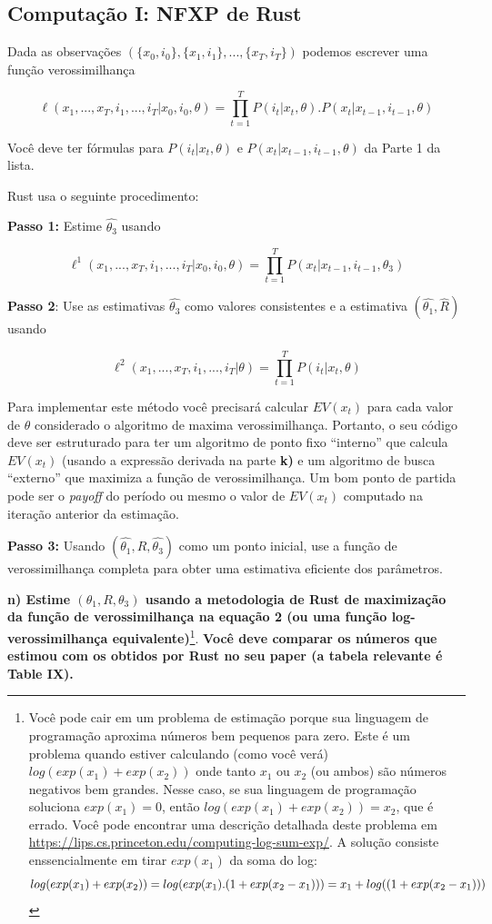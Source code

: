 \documentclass[12pt,a4paper]{article}
\let\rmarkdownfootnote\footnote%
\def\footnote{\protect\rmarkdownfootnote}
\begin{document}
\hypertarget{computacao-i-nfxp-de-rust}{%
\subsection{Computação I: NFXP de
Rust}\label{computacao-i-nfxp-de-rust}}

Dada as observações
\((\{x_0, i_0\},\{x_1,i_1\} , . . . , \{x_T, i_T\})\) podemos escrever
uma função verossimilhança

\[
\ell (x_1,...,x_T,i_1,...,i_T|x_0,i_0,\theta) = \prod_{t=1}^T P(i_t|x_t,\theta).P(x_t|x_{t-1},i_{t-1},\theta)
\label{eq:2}
\]

Você deve ter fórmulas para \(P(i_t|x_t,\theta)\) e
\(P(x_t|x_{t-1},i_{t-1},\theta)\) da Parte 1 da lista.

Rust usa o seguinte procedimento:

\textbf{Passo 1:} Estime \(\hat{\theta_3}\) usando

\[
\ell^1 (x_1,...,x_T,i_1,...,i_T|x_0,i_0,\theta) = \prod_{t=1}^T P(x_t|x_{t-1},i_{t-1},\theta_3)
\]

\textbf{Passo 2}: Use as estimativas \(\hat{\theta_3}\) como valores
consistentes e a estimativa \((\hat{\theta_1},\hat{R})\) usando

\[
\ell^2 (x_1,...,x_T,i_1,...,i_T|\theta)= \prod_{t=1}^T P(i_t|x_t,\theta)
\]

Para implementar este método você precisará calcular \(EV(x_t)\) para
cada valor de \(\theta\) considerado o algoritmo de maxima
verossimilhança. Portanto, o seu código deve ser estruturado para ter um
algoritmo de ponto fixo ``interno'' que calcula \(EV(x_t)\) (usando a
expressão derivada na parte \textbf{k)} e um algoritmo de busca
``externo'' que maximiza a função de verossimilhança. Um bom ponto de
partida pode ser o \emph{payoff} do período ou mesmo o valor de
\(EV(x_t)\) computado na iteração anterior da estimação.

\textbf{Passo 3:} Usando \((\hat{\theta_1},\hat{R},\hat{\theta_3})\)
como um ponto inicial, use a função de verossimilhança completa para
obter uma estimativa eficiente dos parâmetros.

\textbf{n) Estime \((\theta_1, R,\theta_3)\) usando a metodologia de
Rust de maximização da função de verossimilhança na equação 2 (ou uma
função log-verossimilhança equivalente)}\footnote{Você pode cair em um
  problema de estimação porque sua linguagem de programação aproxima
  números bem pequenos para zero. Este é um problema quando estiver
  calculando (como você verá) \(log(exp(x_1) + exp(x_2))\) onde tanto
  \(x_1\) ou \(x_2\) (ou ambos) são números negativos bem grandes. Nesse
  caso, se sua linguagem de programação soluciona \(exp(x_1)= 0\), então
  \(log(exp(x_1) + exp(x_2))=x_2\), que é errado. Você pode encontrar
  uma descrição detalhada deste problema em
  \url{https://lips.cs.princeton.edu/computing-log-sum-exp/}. A solução
  consiste enssencialmente em tirar \(exp (x_1)\) da soma do log: \[
  log(exp(x_1) + exp(x_2))= log (exp(x_1).(1 + exp (x_2 - x_1))) \\
  = x_1 + log((1+exp(x_2-x_1)))
  \]}. \textbf{Você deve comparar os números que estimou com os obtidos
por Rust no seu paper (a tabela relevante é Table IX).}
\end{document}
